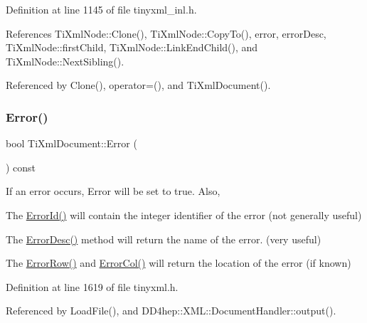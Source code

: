 Definition at line 1145 of file tinyxml\+\_\+inl.\+h.



References Ti\+Xml\+Node\+::\+Clone(), Ti\+Xml\+Node\+::\+Copy\+To(), error, error\+Desc, Ti\+Xml\+Node\+::first\+Child, Ti\+Xml\+Node\+::\+Link\+End\+Child(), and Ti\+Xml\+Node\+::\+Next\+Sibling().



Referenced by Clone(), operator=(), and Ti\+Xml\+Document().

\hypertarget{class_ti_xml_document_a348e68faad4a3498f413c51ee9bc321a}{}\label{class_ti_xml_document_a348e68faad4a3498f413c51ee9bc321a} 
\subsubsection{\texorpdfstring{Error()}{Error()}}
{\footnotesize\ttfamily bool Ti\+Xml\+Document\+::\+Error (\begin{DoxyParamCaption}{ }\end{DoxyParamCaption}) const\hspace{0.3cm}{\ttfamily [inline]}}

If an error occurs, Error will be set to true. Also,
\begin{DoxyItemize}
\item The \hyperlink{class_ti_xml_document_abd928b49a646c8ed53e0453c555d96a2}{Error\+Id()} will contain the integer identifier of the error (not generally useful)
\item The \hyperlink{class_ti_xml_document_aab511be262e84a003e3bb86f0215c8c2}{Error\+Desc()} method will return the name of the error. (very useful)
\item The \hyperlink{class_ti_xml_document_a062e5257128a7da31b0b2e38cd524600}{Error\+Row()} and \hyperlink{class_ti_xml_document_adea69de889449a2587afb8ee043f43f5}{Error\+Col()} will return the location of the error (if known) 
\end{DoxyItemize}

Definition at line 1619 of file tinyxml.\+h.



Referenced by Load\+File(), and D\+D4hep\+::\+X\+M\+L\+::\+Document\+Handler\+::output().

\hypertarget{class_ti_xml_document_adea69de889449a2587afb8ee043f43f5}{}\label{class_ti_xml_document_adea69de889449a2587afb8ee043f43f5} 

